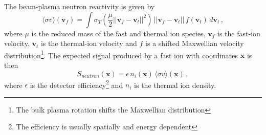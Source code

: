 The beam-plasma neutron reactivity is given by
\begin{equation}
    \langle \sigma v \rangle(\mathbf{v}_f) = \int \sigma_T(\frac{\mu}{2}||\mathbf{v}_f - \mathbf{v}_t||^2)\, ||\mathbf{v}_f - \mathbf{v}_t||\, f(\mathbf{v}_t)\, d\mathbf{v}_t\,,
\end{equation}
where $\mu$ is the reduced mass of the fast and thermal ion species, $\mathbf{v}_f$ is the fast-ion velocity, $\mathbf{v}_t$ is the thermal-ion velocity and $f$ is a shifted Maxwellian velocity distribution\footnote{The bulk plasma rotation shifts the Maxwellian distribution}.
The expected signal produced by a fast ion with coordinates $\mathbf{x}$ is then 
\begin{equation}\label{eq:W_neutron}
    S_{neutron}(\mathbf{x}) = \epsilon \, n_i(\mathbf{x})\,\langle \sigma v \rangle (\mathbf{x}) \,,
\end{equation}
where $\epsilon$ is the detector efficiency\footnote{The efficiency is usually spatially and energy dependent} and $n_i$ is the thermal ion density.